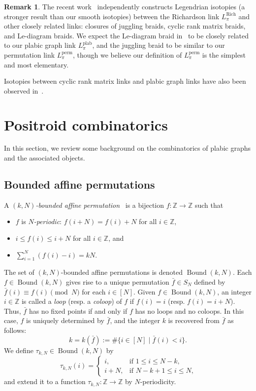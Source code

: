 \documentclass[11pt]{article}
\theoremstyle{definition}
\newtheorem{remark}[theo]{Remark}
\numberwithin{equation}{section}
\newcommand\Z{\mathbb{Z}}
\newcommand\Boundkn{\operatorname{Bound}(k,\n)}
\newcommand\Sn{S_\n}
\newcommand\perm{\operatorname{perm}}
\newcommand\Lperm{L^{\perm}}
\newcommand\rich{\operatorname{Rich}}
\newcommand\Lrich{L^{\rich}}
\newcommand\plab{\operatorname{plab}}
\newcommand\Lplab{L^{\plab}}
\newcommand\fp{\pi}
\newcommand\fbar{\bar f}
\newcommand\taukn{\tau_{k,\n}}
\newcommand\n{N}
\begin{document}
%
%
%

%

%


\begin{remark}
The recent work~\cite{CGGS} independently constructs Legendrian isotopies (a stronger result than our smooth isotopies) between the Richardson link $\Lrich_\pi$ and other closely related links: closures of juggling braids, cyclic rank matrix braids, and Le-diagram braids.  We expect the Le-diagram braid in~\cite{CGGS} to be closely related to our plabic graph link $\Lplab_\fp$, and the juggling braid to be similar to our permutation link $\Lperm_\fp$, though we believe our definition of $\Lperm_\fp$ is the simplest and most elementary.

Isotopies between cyclic rank matrix links and plabic graph links have also been observed in~\cite{STWZ}.
%
%
\end{remark}

\section{Positroid combinatorics}\label{sec:positr-comb}
In this section, we review some background on the combinatorics of plabic graphs and the associated objects.


\subsection{Bounded affine permutations}\label{sec:bound-affine-perm}
A \emph{$(k,\n)$-bounded affine permutation}~\cite{KLS} is a bijection $f:\Z\to\Z$ such that 
\begin{itemize}
\item $f$ is \emph{$\n$-periodic}: $f(i+\n)=f(i)+\n$ for all $i\in \Z$,
\item  $i\leq f(i)\leq i+\n$ for all $i\in\Z$, and %
\item $\sum_{i=1}^\n(f(i)-i)=k\n$.
\end{itemize}
The set of $(k,\n)$-bounded affine permutations is denoted $\Boundkn$. Each $f\in\Boundkn$ gives rise to a unique permutation $\fbar\in\Sn$ defined by $\fbar(i)\equiv f(i)\pmod \n$ for each $i\in[\n]$. Given $f\in\Boundkn$, an integer $i\in\Z$ is called a \emph{loop} (resp. a \emph{coloop}) of $f$ if $f(i)=i$ (resp. $f(i)=i+\n$). Thus, $\fbar$ has no fixed points if and only if $f$ has no loops and no coloops. In this case, $f$ is uniquely determined by $\fbar$, and the integer $k$ is recovered from $\fbar$ as follows:
\begin{equation*}%
  k=k(\fbar):=\#\{i\in[\n]\mid \fbar(i)<i\}.
\end{equation*}
We define $\taukn\in\Boundkn$  by
\begin{equation*}%
  \taukn(i)=
  \begin{cases}
    i, &\text{if $1\leq i\leq \n-k$,}\\
    i+\n, &\text{if $\n-k+1\leq i\leq \n$,}
  \end{cases}
\end{equation*}
and extend it to a function $\taukn:\Z\to\Z$ by $\n$-periodicity. 
\end{document}
